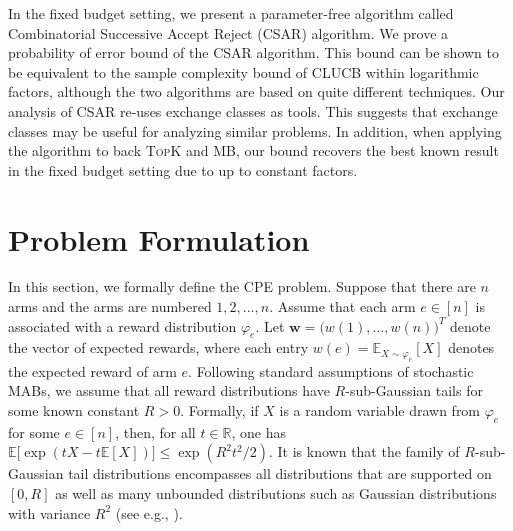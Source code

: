 \documentclass{article}
\newcommand{\wei}[1]{}
\newcommand{\wei}[1]{{\color{blue!50!black}  [\text{Wei:} #1]}}
\newcommand{\junk}[1]{}
\newcommand{\Algorithm}{{\small \textsf{CLUCB}}\xspace}
\newcommand{\AlgorithmBud}{{\small \textsf{CSAR}}\xspace}
\newcommand{\Problem}{{CPE}\xspace}
\newcommand{\Rew}{\varphi}
\newcommand{\E}{\mathbb E}
\newcommand{\RR}{\mathbb R}
\newcommand{\MultiIdent}{\textsc{TopK}\xspace}
\newcommand{\MultiBandit}{\textsc{MB}\xspace}
\renewcommand{\vec}[1]{\boldsymbol{#1}}
\begin{document}
In the fixed budget setting, we present a parameter-free algorithm called Combinatorial Successive Accept Reject (\AlgorithmBud) algorithm.
We prove a probability of error bound of the \AlgorithmBud algorithm. 
This bound can be shown to be equivalent to the sample complexity bound of \Algorithm within logarithmic factors, although the two algorithms are based on quite different techniques. 
Our analysis of \AlgorithmBud re-uses exchange classes as tools. 
This suggests that exchange classes may be useful for analyzing  similar problems. 
In addition, when applying the algorithm to back \MultiIdent and \MultiBandit, our bound recovers the best known result in the fixed budget setting due to \citet{bubeck2013multiple} up to constant factors. 

\junk{
\textbf{Useful notations.} Let $[n]$ denote the set $\{1,\ldots,n\}$. Suppose that $\vec w\in \RR^{n}$ is a vector and $E\subseteq[n]$ is a set. 
Let $w(i)$ denote the $i$-th entry of $\vec w$. 
We define $w(E) \triangleq  \sum_{i\in E} w(i)$ to be the sum of entries indexed by $E$.
}
\vspace{-0.7em}
\section{Problem Formulation}
\vspace{-0.7em}
In this section,  we formally define the \Problem problem.
Suppose that there are $n$ arms and the arms are numbered $1,2,\ldots,n$.
Assume that each arm $e\in[n]$ is associated with a reward distribution $\Rew_e$.
Let $\vec w = \big(w(1),\ldots, w(n)\big)^T$ denote the vector of expected rewards, where each entry $w(e)=\E_{X\sim \Rew_e}[X]$ denotes the expected reward of arm $e$.
Following standard assumptions of stochastic MABs, we assume that all reward distributions have $R$-sub-Gaussian tails for some known constant $R>0$. 
Formally, if $X$ is a random variable drawn from $\Rew_e$ for some $e\in[n]$, then, for all $t\in \RR$, one has $\mathbb E\big[\exp(tX-t\mathbb E[X])\big] \le \exp(R^2t^2/2)$.
It is known that the family of $R$-sub-Gaussian tail distributions encompasses all distributions that are supported on $[0,R]$ as well as many unbounded distributions such as Gaussian distributions with variance $R^2$ (see e.g., \citep{pollard2000asymptopia,rivasplata2012subgaussian}).
\end{document}
